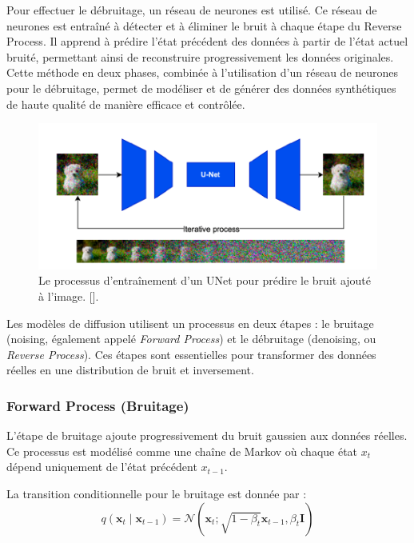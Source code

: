 Pour effectuer le débruitage, un réseau de neurones est utilisé. Ce réseau de
neurones est entraîné à détecter et à éliminer le bruit à chaque étape du
Reverse Process. Il apprend à prédire l'état précédent des données à partir de
l'état actuel bruité, permettant ainsi de reconstruire progressivement les
données originales. Cette méthode en deux phases, combinée à l'utilisation d'un
réseau de neurones pour le débruitage, permet de modéliser et de générer des
données synthétiques de haute qualité de manière efficace et contrôlée.

\begin{figure}[hbt!]
	\centering
	\includegraphics[width=12cm]{images_pfe/Unet.png}
	\caption{ Le processus d'entraînement d'un UNet pour prédire le bruit ajouté à l'image. [\cite{nichol2021improved}].}
	\label{fig:unet}
\end{figure}
\FloatBarrier

Les modèles de diffusion utilisent un processus en deux étapes : le bruitage
(noising, également appelé \textit{Forward Process}) et le débruitage
(denoising, ou \textit{Reverse Process}). Ces étapes sont essentielles pour
transformer des données réelles en une distribution de bruit et inversement.

\subsubsection{Forward Process (Bruitage)}

L'étape de bruitage ajoute progressivement du bruit gaussien aux données
réelles. Ce processus est modélisé comme une chaîne de Markov où chaque état \(
x_t \) dépend uniquement de l'état précédent \( x_{t-1} \).

La transition conditionnelle pour le bruitage est donnée par :
\begin{equation}
    q(\mathbf{x}_t \mid \mathbf{x}_{t-1}) = \mathcal{N}(\mathbf{x}_t; \sqrt{1 - \beta_t} \mathbf{x}_{t-1}, \beta_t \mathbf{I})
\end{equation}


